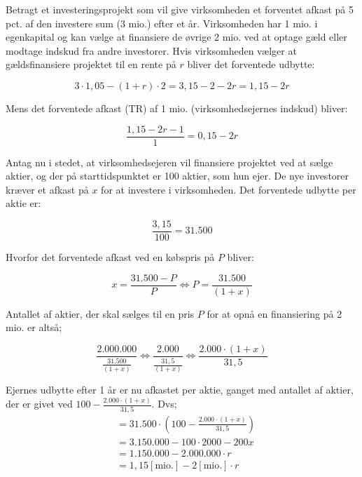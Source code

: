 \documentclass[10pt,reqno, usenames]{article}
\begin{document}
\begin{tcolorbox}[breakable, colback=red!5!white, colframe=red!50!black, title= Eksempel 9: Forholdet mellem gælds- og egenkapitalsfinansiering]
Betragt et investeringsprojekt som vil give virksomheden et forventet afkast på 5 pct. af den investere sum (3 mio.) efter et år. Virksomheden har 1 mio. i egenkapital og kan vælge at finansiere de øvrige 2 mio. ved at optage gæld eller modtage indskud fra andre investorer. Hvis virksomheden vælger at gældsfinansiere projektet til en rente på $r$ bliver det forventede udbytte: 

\begin{equation*}
    3 \cdot 1,05 - (1+r) \cdot 2 = 3,15 - 2 - 2r = 1,15 - 2r
\end{equation*}

Mens det forventede afkast (TR) af 1 mio. (virksomhedsejernes indskud) bliver: 

\begin{equation*}
    \frac{1,15 - 2r - 1}{1} = 0,15 - 2r
\end{equation*}

Antag nu i stedet, at virksomhedsejeren vil finansiere projektet ved at sælge aktier, og der på starttidspunktet er 100 aktier, som hun ejer. De nye investorer kræver et afkast på $x$ for at investere i virksomheden. Det forventede udbytte per aktie er: 

\begin{equation*}
    \frac{3,15}{100} = 31.500 
\end{equation*}

Hvorfor det forventede afkast ved en købspris på $P$ bliver: 

\begin{equation*}
    x = \frac{31.500-P}{P} \Longleftrightarrow P = \frac{31.500}{(1+x)}
\end{equation*}

Antallet af aktier, der skal sælges til en pris $P$ for at opnå en finansiering på 2 mio. er altså; 

\begin{equation*}
    \frac{2.000.000}{\frac{31.500}{(1+x)}} \Longleftrightarrow \frac{2.000}{\frac{31,5}{(1+x)}} \Longleftrightarrow  \frac{2.000 \cdot (1+x)}{31,5}
\end{equation*}

Ejernes udbytte efter 1 år er nu afkastet per aktie, ganget med antallet af aktier, der er givet ved $100-\frac{2.000 \cdot (1+x)}{31,5}$. Dvs;
\begin{align*}
    &= 31.500 \cdot (100-\frac{2.000 \cdot (1+x)}{31,5}) \\
    & = 3.150.000 - 100 \cdot 2000 - 200x \\
    & = 1.150.000 - 2.000.000 \cdot r \\
    & =  1,15 [\text{mio.}] - 2 [\text{mio.}] \cdot r
\end{align*}


\end{tcolorbox}
\end{document}
